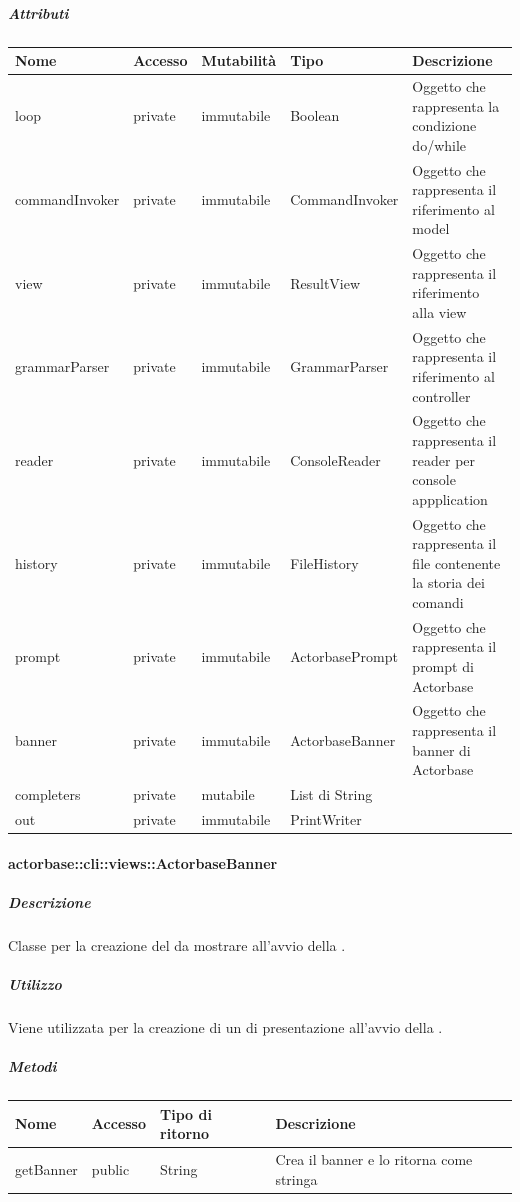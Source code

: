 \documentclass{scalatekids-article}
\begin{document}
\subparagraph{Attributi}

\begin{tabular}{| l | l | l | l | l |}
	\hline
	Nome & Accesso & Mutabilità & Tipo & Descrizione\\
	\hline
	loop & private & immutabile & Boolean & Oggetto che rappresenta la condizione do/while\\
	\hline
	commandInvoker & private & immutabile & CommandInvoker & Oggetto che rappresenta il riferimento al model\\
	\hline
	view & private & immutabile & ResultView & Oggetto che rappresenta il riferimento alla view\\
	\hline
	grammarParser & private & immutabile & GrammarParser & Oggetto che rappresenta il riferimento al controller\\
	\hline
	reader & private & immutabile & ConsoleReader & Oggetto che rappresenta il reader per console appplication \\
	\hline
	history & private & immutabile & FileHistory & Oggetto che rappresenta il file contenente la storia dei comandi\\
	\hline
	prompt & private & immutabile & ActorbasePrompt & Oggetto che rappresenta il prompt di Actorbase\\
	\hline
	banner & private & immutabile & ActorbaseBanner & Oggetto che rappresenta il banner di Actorbase\\
	\hline
	completers & private & mutabile & List di String & \\ %
	\hline
	out & private & immutabile & PrintWriter & \\ %
	\hline
\end{tabular}

\paragraph{actorbase::cli::views::ActorbaseBanner}
\label{sec:actorbase::cli::views::ActorbaseBanner}

\subparagraph{Descrizione}

Classe per la creazione del  da mostrare all'avvio della
.

\subparagraph{Utilizzo}

Viene utilizzata per la creazione di un  di presentazione
all'avvio della .

\subparagraph{Metodi}

\begin{tabular}{| l | l | l | l |}
	\hline
	Nome & Accesso & Tipo di ritorno & Descrizione\\
	\hline
	getBanner & public & String & Crea il banner e lo ritorna come stringa\\
	\hline
\end{tabular}
\end{document}

